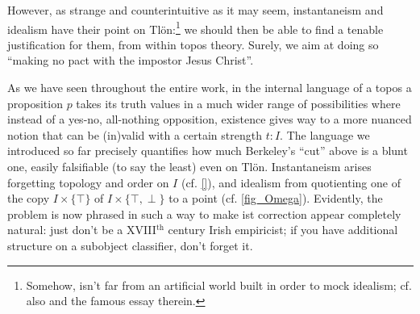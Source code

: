 However, as strange and counterintuitive as it may seem, instantaneism and idealism have their point on Tl\"on:\footnote{Somehow, \cite{tlonEN} isn't far from an artificial world built in order to mock idealism; cf. also \cite{borges1997otras} and the famous essay \cite{confutacion} therein.} we should then be able to find a tenable justification for them, from within topos theory. Surely, we aim at doing so ``making no pact with the impostor Jesus Christ''.

As we have seen throughout the entire work, in the internal language of a topos a proposition $p$ takes its truth values in a much wider range of possibilities where instead of a yes-no, all-nothing opposition, existence gives way to a more nuanced notion that can be (in)valid with a certain strength $t : I$. The language we introduced so far precisely quantifies how much Berkeley's ``cut'' above is a blunt one, easily falsifiable (to say the least) even on Tl\"on. Instantaneism arises forgetting topology and order on $I$ (cf. \autoref{}), and idealism from quotienting one of the copy $I\times \{\top\}$ of $I\times \{\top,\perp\}$ to a point (cf. \autoref{fig_Omega}). Evidently, the problem is now phrased in such a way to make ist correction appear completely natural: just don't be a XVIII$^\text{th}$ century Irish empiricist; if you have additional structure on a subobject classifier, don't forget it.

